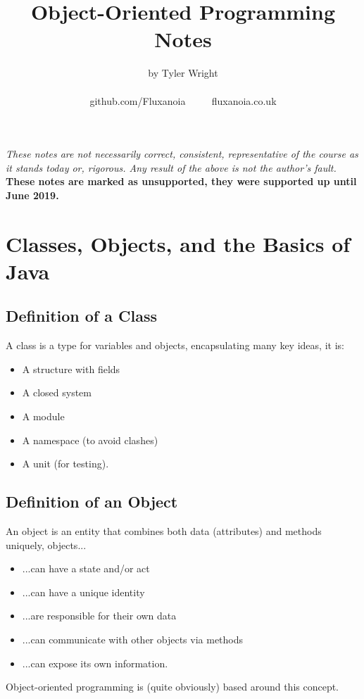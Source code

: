 \documentclass[a4paper, 12pt, twoside]{article}
\begin{document}
\title{Object-Oriented Programming Notes}
\date{}
\author{by Tyler Wright \\
  \\
  github.com/Fluxanoia $\qquad$ fluxanoia.co.uk
}
\maketitle

\vfill

\textit{These notes are not necessarily correct,
consistent, representative of the course as it stands today or, 
rigorous. Any result of the above is not the author's fault.}
\\[\baselineskip]
\textbf{These notes are marked as unsupported, they were supported
up until June 2019.}

\newpage

\section{Classes, Objects, and the Basics of Java}

\subsection{Definition of a Class}

A class is a type for variables and objects, encapsulating many key
ideas, it is:
\begin{itemize}
    \item A structure with fields
    \item A closed system
    \item A module
    \item A namespace (to avoid clashes)
    \item A unit (for testing).
\end{itemize}

\subsection{Definition of an Object}

An object is an entity that combines both data (attributes) and
methods uniquely, objects...
\begin{itemize}
    \item ...can have a state and/or act
    \item ...can have a unique identity
    \item ...are responsible for their own data
    \item ...can communicate with other objects via methods
    \item ...can expose its own information.
\end{itemize}
Object-oriented programming is (quite obviously) based around this
concept.
\end{document}
